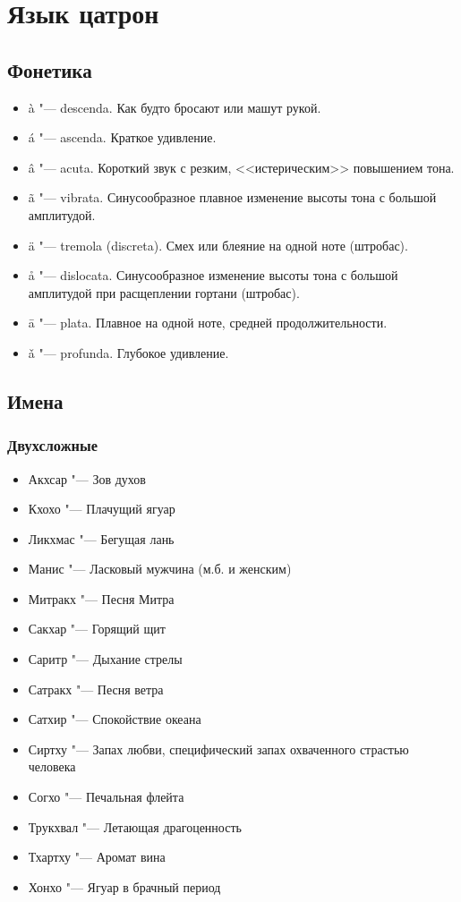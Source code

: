 \section{Язык цатрон}

\subsection{Фонетика}

\begin{itemize}
\item \`a "--- descenda. Как будто бросают или машут рукой.
\item \'a "--- ascenda. Краткое удивление.
\item \^a "--- acuta. Короткий звук с резким, <<истерическим>> повышением тона.
\item \~a "--- vibrata. Синусообразное плавное изменение высоты тона с большой амплитудой.
\item \"a "--- tremola (discreta). Смех или блеяние на одной ноте (штробас).
\item \r{a} "--- dislocata. Синусообразное изменение высоты тона с большой амплитудой при расщеплении гортани (штробас).
\item \=a "--- plata. Плавное на одной ноте, средней продолжительности.
\item \v{a} "--- profunda. Глубокое удивление.
\end{itemize}

\subsection{Имена}

\subsubsection{Двухсложные}

\begin{itemize}
\item Акхсар "--- Зов духов
\item Кхохо "--- Плачущий ягуар
\item Ликхмас "--- Бегущая лань
\item Манис "--- Ласковый мужчина (м.б. и женским)
\item Митракх "--- Песня Митра
\item Сакхар "--- Горящий щит
\item Саритр "--- Дыхание стрелы
\item Сатракх "--- Песня ветра
\item Сатхир "--- Спокойствие океана
\item Сиртху "--- Запах любви, специфический запах охваченного страстью человека
\item Согхо "--- Печальная флейта
\item Трукхвал "--- Летающая драгоценность
\item Тхартху "--- Аромат вина
\item Хонхо "--- Ягуар в брачный период
\end{itemize}

